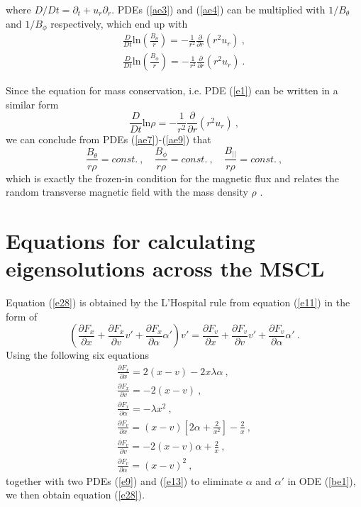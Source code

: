 \documentclass[fleqn,usenatbib]{mnras}
\begin{document}
where $D/Dt=\partial_{t}+u_{r}\partial_{r}$. PDEs (\ref{ae3}) and (\ref{ae4}) can be multiplied with $1/B_{\theta}$ and $1/B_{\phi}$ respectively, which end up with
\begin{gather}
\frac{D}{Dt}\mathrm{ln}\left(\frac{B_{\theta}}{r}\right)=-\frac{1}{r^{2}}\frac{\partial}{\partial r}\left(r^{2}u_{r}\right)\ ,\label{ae7}\\
\frac{D}{Dt}\mathrm{ln}\left(\frac{B_{\phi}}{r}\right)=-\frac{1}{r^{2}}\frac{\partial}{\partial r}\left(r^{2}u_{r}\right)\ .\label{ae8}
\end{gather}

Since the equation for mass conservation, i.e. PDE (\ref{e1}) can be written in a similar form
\begin{equation}
\frac{D}{Dt}\mathrm{ln}\rho=-\frac{1}{r^{2}}\frac{\partial}{\partial r}\left(r^{2}u_{r}\right)\ ,\label{ae9}
\end{equation}
we can conclude from PDEs (\ref{ae7})-(\ref{ae9}) that
\begin{equation}
\frac{B_{\theta}}{r\rho}=const.\ , \quad \frac{B_{\phi}}{r\rho}=const.\ , \quad \frac{B_{||}}{r\rho}=const.\ ,
\end{equation}
which is exactly the frozen-in condition for the magnetic flux and relates the random transverse magnetic field with the mass density $\rho$ \citep{yuLou2005}.

\section{Equations for calculating eigensolutions across the MSCL}
\label{a2}
Equation (\ref{e28}) is obtained by the L'Hospital rule from equation (\ref{e11}) in the form of 
\begin{equation}
\left(\frac{\partial F_{x}}{\partial x}+\frac{\partial F_{x}}{\partial v}v'+\frac{\partial F_{x}}{\partial \alpha}\alpha'\right) v'=\frac{\partial F_{v}}{\partial x}+\frac{\partial F_{v}}{\partial v}v'+\frac{\partial F_{v}}{\partial \alpha}\alpha'\ .\label{be1}
\end{equation}
Using the following six equations
\begin{gather}
\frac{\partial F_{x}}{\partial x}=2(x-v)-2x\lambda\alpha\ ,\\
\frac{\partial F_{x}}{\partial v}=-2(x-v)\ ,\\
\frac{\partial F_{x}}{\partial \alpha}=-\lambda x^{2}\ ,\\
\frac{\partial F_{v}}{\partial x}=(x-v)\left[2\alpha+\frac{2}{x^{2}}\right]-\frac{2}{x}\ ,\\
\frac{\partial F_{v}}{\partial v}=-2(x-v)\alpha+\frac{2}{x}\ ,\\
\frac{\partial F_{v}}{\partial \alpha}=(x-v)^{2}\ ,
\end{gather}
together with two PDEs (\ref{e9}) and (\ref{e13}) to eliminate $\alpha$ and $\alpha'$ in ODE (\ref{be1}), we then obtain equation (\ref{e28}).
\end{document}
